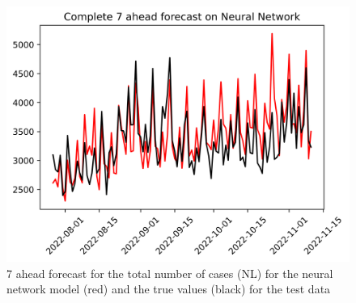 \begin{figure}
\begin{minipage}{.32\textwidth}
  \label{fig:tot_cases_fc_7_xgb_DE}
\end{minipage}
\begin{minipage}{.32\textwidth}
  \centering
  \includegraphics[width=\linewidth]{pics/7_ah/Complete_7_ahead_Neural Network.png}
  \caption{7 ahead forecast for the total number of cases (NL) for the neural network model (red) and the true values (black) for the test data}
  \label{fig:tot_cases_fc_7_nn}
\end{minipage}

\end{figure}
